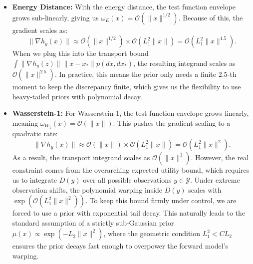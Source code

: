 \documentclass[twoside,11pt]{article}
\begin{document}
\begin{itemize}
    \item \textbf{Energy Distance:} With the energy distance, the test function envelope grows sub-linearly, giving us $\omega_E(x) = \mathcal{O}(\|x\|^{1/2})$. Because of this, the gradient scales as:
    $$\|\nabla h_y(x)\| \approx \mathcal{O}(\|x\|^{1/2}) \times \mathcal{O}(L_1^2 \|x\|) = \mathcal{O}(L_1^2 \|x\|^{1.5}).$$
    When we plug this into the transport bound $\int \|\nabla h_y(z)\| \|x - x_*\| p(dx, dx_*)$, the resulting integrand scales as $\mathcal{O}(\|x\|^{2.5})$. In practice, this means the prior only needs a finite 2.5-th moment to keep the discrepancy finite, which gives us the flexibility to use heavy-tailed priors with polynomial decay.
    
    \item \textbf{Wasserstein-1:} For Wasserstein-1, the test function envelope grows linearly, meaning $\omega_{W_1}(x) = \mathcal{O}(\|x\|)$. This pushes the gradient scaling to a quadratic rate:
    $$\|\nabla h_y(x)\| \approx \mathcal{O}(\|x\|) \times \mathcal{O}(L_1^2 \|x\|) = \mathcal{O}(L_1^2 \|x\|^2).$$
    As a result, the transport integrand scales as $\mathcal{O}(\|x\|^3)$. However, the real constraint comes from the overarching expected utility bound, which requires us to integrate $D(y)$ over all possible observations $y \in \mathcal{Y}$. Under extreme observation shifts, the polynomial warping inside $D(y)$ scales with $\exp(\mathcal{O}(L_1^2 \|x\|^2))$. To keep this bound firmly under control, we are forced to use a prior with exponential tail decay. This naturally leads to the standard assumption of a strictly sub-Gaussian prior $\mu(x) \propto \exp(-L_2\|x\|^2)$, where the geometric condition $L_1^2 < C L_2$ ensures the prior decays fast enough to overpower the forward model's warping.
\end{itemize}


\vskip 0.2in

\end{document}
